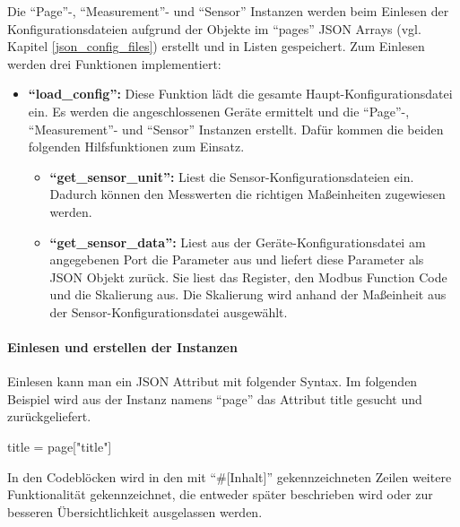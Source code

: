 Die \enquote{Page}-, \enquote{Measurement}- und \enquote{Sensor} Instanzen werden beim Einlesen der Konfigurationsdateien aufgrund der Objekte im \enquote{pages} JSON Arrays (vgl. Kapitel \ref{json_config_files}) erstellt und in Listen gespeichert. \newline
Zum Einlesen werden drei Funktionen implementiert:
\begin{itemize}
	\item \textbf{\enquote{load\_config}:} Diese Funktion lädt die gesamte Haupt-Konfigurationsdatei ein. Es werden die angeschlossenen Geräte ermittelt und die \enquote{Page}-, \enquote{Measurement}- und \enquote{Sensor} Instanzen erstellt. Dafür kommen die beiden folgenden Hilfsfunktionen zum Einsatz.
    \begin{itemize}
		\item \textbf{\enquote{get\_sensor\_unit}:} Liest die Sensor-Konfigurationsdateien ein. Dadurch können den Messwerten die richtigen Maßeinheiten zugewiesen werden.
		\item \textbf{\enquote{get\_sensor\_data}:} Liest aus der Geräte-Konfigurationsdatei am angegebenen Port die Parameter aus und liefert diese Parameter als JSON Objekt zurück. Sie liest das Register, den Modbus Function Code und die Skalierung aus. Die Skalierung wird anhand der Maßeinheit aus der Sensor-Konfigurationsdatei ausgewählt.
	\end{itemize}
\end{itemize}

\paragraph{Einlesen und erstellen der Instanzen}
Einlesen kann man ein JSON Attribut mit folgender Syntax. Im folgenden Beispiel wird aus der Instanz namens \enquote{page} das Attribut title gesucht und zurückgeliefert.
\begin{pythoncode}
title = page["title"]
\end{pythoncode}

In den Codeblöcken wird in den mit \enquote{\#[Inhalt]} gekennzeichneten Zeilen weitere Funktionalität gekennzeichnet, die entweder später beschrieben wird oder zur besseren Übersichtlichkeit ausgelassen werden. 

